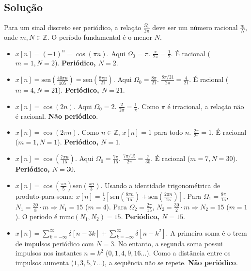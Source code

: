 \documentclass[tcc]{classe_uftex/uftex}
\begin{document}
\subsection*{Solução}

Para um sinal discreto ser periódico, a relação $\frac{\Omega_0}{2\pi}$ deve ser um número racional $\frac{m}{N}$, onde $m, N \in \mathbb{Z}$. O período fundamental é o menor $N$.

\begin{itemize}
    \item[\textbf{a)}] $x[n] = (-1)^n = \cos(\pi n)$. Aqui $\Omega_0 = \pi$.
    $\frac{\pi}{2\pi} = \frac{1}{2}$. É racional ($m=1, N=2$). 
    \textbf{Periódico, $N = 2$}.

    \item[\textbf{b)}] $x[n] = \text{sen}\left(\frac{40\pi n}{105}\right) = \text{sen}\left(\frac{8\pi n}{21}\right)$. Aqui $\Omega_0 = \frac{8\pi}{21}$.
    $\frac{8\pi/21}{2\pi} = \frac{4}{21}$. É racional ($m=4, N=21$).
    \textbf{Periódico, $N = 21$}.

    \item[\textbf{c)}] $x[n] = \cos(2n)$. Aqui $\Omega_0 = 2$.
    $\frac{2}{2\pi} = \frac{1}{\pi}$. Como $\pi$ é irracional, a relação não é racional.
    \textbf{Não periódico}.

    \item[\textbf{d)}] $x[n] = \cos(2\pi n)$. Como $n \in \mathbb{Z}$, $x[n] = 1$ para todo $n$.
    $\frac{2\pi}{2\pi} = 1$. É racional ($m=1, N=1$).
    \textbf{Periódico, $N = 1$}.

    \item[\textbf{e)}] $x[n] = \cos\left(\frac{7\pi n}{15}\right)$. Aqui $\Omega_0 = \frac{7\pi}{15}$.
    $\frac{7\pi/15}{2\pi} = \frac{7}{30}$. É racional ($m=7, N=30$).
    \textbf{Periódico, $N = 30$}.

    \item[\textbf{f)}] $x[n] = \cos\left(\frac{\pi n}{5}\right)\text{sen}\left(\frac{\pi n}{3}\right)$. Usando a identidade trigonométrica de produto-para-soma:
    $x[n] = \frac{1}{2}\left[\text{sen}\left(\frac{8\pi n}{15}\right) + \text{sen}\left(\frac{2\pi n}{15}\right)\right]$.
    Para $\Omega_1 = \frac{8\pi}{15}$, $N_1 = \frac{30}{8} \cdot m \Rightarrow N_1 = 15$ ($m=4$).
    Para $\Omega_2 = \frac{2\pi}{15}$, $N_2 = \frac{30}{2} \cdot m \Rightarrow N_2 = 15$ ($m=1$).
    O período é $\text{mmc}(N_1, N_2) = 15$.
    \textbf{Periódico, $N = 15$}.

    \item[\textbf{g)}] $x[n] = \sum_{k=-\infty}^{\infty} \delta[n-3k] + \sum_{k=-\infty}^{\infty} \delta[n-k^2]$.
    A primeira soma é o trem de impulsos periódico com $N=3$. No entanto, a segunda soma possui impulsos nos instantes $n = k^2$ ($0, 1, 4, 9, 16 \dots$). Como a distância entre os impulsos aumenta ($1, 3, 5, 7 \dots$), a sequência não se repete.
    \textbf{Não periódico}.


\end{itemize}
\end{document}
